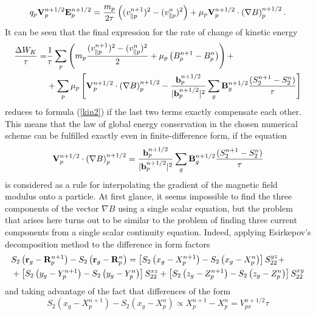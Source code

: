 \documentclass[final,3p]{elsarticle}
\begin{document}
\begin{equation}
	q_p {\bf V}_p^{n+1/2} {\bf E}_p^{n+1/2}= \frac{m_p}{2\tau}\left( (v_{\|p}^{n+1})^2-(v_{\|p}^{n})^2\right) + \mu_p {\bf V}_p^{n+1/2}\cdot \left(\nabla B\right)_p^{n+1/2}.
\end{equation}
It can be seen that the final expression for the rate of change of kinetic energy
\begin{align}
	\frac{\Delta W_K}{\tau}=&\frac{1}{\tau}\sum\limits_p\left(m_p \frac{(v_{\|p}^{n+1})^2-(v_{\|p}^{n})^2}{2}+\mu_p \left(B_p^{n+1}-B_p^n\right)\right)+\nonumber \\
	&+ \sum\limits_p \mu_p \left[{\bf V}_p^{n+1/2}\cdot \left(\nabla B\right)_p^{n+1/2}-\frac{{\bf b}_p^{n+1/2}}{|{\bf b}_p^{n+1/2}|^2}\sum\limits_g {\bf B}_g^{n+1/2} \frac{(S_2^{n+1}-S_2^n)}{\tau}\right]
\end{align}  
reduces to formula (\ref{kin2}) if the last two terms exactly compensate each other. This means that the law of global energy conservation in the chosen numerical scheme can be fulfilled exactly even in finite-difference form, if the equation
\begin{equation}\label{cond}
	{\bf V}_p^{n+1/2}\cdot \left(\nabla B\right)_p^{n+1/2}=\frac{{\bf b}_p^{n+1/2}}{|{\bf b}_p^{n+1/2}|^2}\sum\limits_g {\bf B}_g^{n+1/2} \frac{(S_2^{n+1}-S_2^n)}{\tau}
\end{equation}
is considered as a rule for interpolating the gradient of the magnetic field modulus onto a particle. At first glance, it seems impossible to find the three components of the vector $\nabla B$ using a single scalar equation, but the problem that arises here turns out to be similar to the problem of finding three current components from a single scalar continuity equation. Indeed, applying Esirkepov's decomposition method to the difference in form factors 
\begin{align}
	&S_2\left({\bf r}_g-{\bf R}_p^{n+1}\right)-S_2\left({\bf r}_g-{\bf R}_p^{n}\right)=\left[S_2\left(x_g-X_p^{n+1}\right)-S_2\left(x_g-X_p^{n}\right)\right]S_{22}^{yz}+\nonumber \\
	&+\left[S_2\left(y_g-Y_p^{n+1}\right)-S_2\left(y_g-Y_p^{n}\right)\right]S_{22}^{xz}+\left[S_2\left(z_g-Z_p^{n+1}\right)-S_2\left(z_g-Z_p^{n}\right)\right]S_{22}^{xy}
\end{align}
and taking advantage of the fact that differences of the form
\begin{equation}
	S_2\left(x_g-X_p^{n+1}\right)-S_2\left(x_g-X_p^{n}\right)\propto X_p^{n+1}-X_p^n=V_{px}^{n+1/2}\tau
\end{equation}
\end{document}
